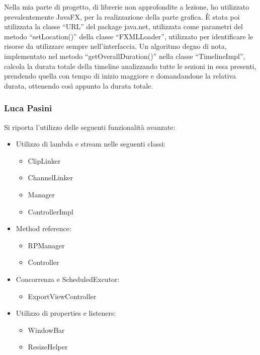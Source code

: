 \documentclass[a4paper,12pt]{report}
\begin{document}
Nella mia parte di progetto, di librerie non approfondite a lezione, ho utilizzato prevalentemente JavaFX, per la realizzazione della parte grafica. È stata poi utilizzata la classe “URL” del package java.net, utilizzata come parametri del metodo “setLocation()” della classe “FXMLLoader”, utilizzato per identificare le risorse da utilizzare sempre nell’interfaccia.
Un algoritmo degno di nota, implementato nel metodo “getOverallDuration()” nella classe “TimelineImpl”, calcola la durata totale della timeline analizzando tutte le sezioni in essa presenti, prendendo quella con tempo di inizio maggiore e domandandone la relativa durata, ottenendo così appunto la durata totale.

\subsubsection{Luca Pasini}
Si riporta l’utilizzo delle seguenti funzionalità avanzate:
\begin{itemize}
    \item Utilizzo di lambda e stream nelle seguenti classi:
    \begin{itemize}
        \item ClipLinker
        \item ChannelLinker
        \item Manager
        \item ControllerImpl
    \end{itemize}
    \item Method reference:
    \begin{itemize}
        \item RPManager
        \item Controller
    \end{itemize}
    \item Concorrenza e ScheduledExcutor:
    \begin{itemize}
        \item ExportViewController
    \end{itemize}
    \item Utilizzo di properties e listeners:
    \begin{itemize}
        \item WindowBar
        \item ResizeHelper
    \end{itemize}
\end{itemize}
\end{document}
